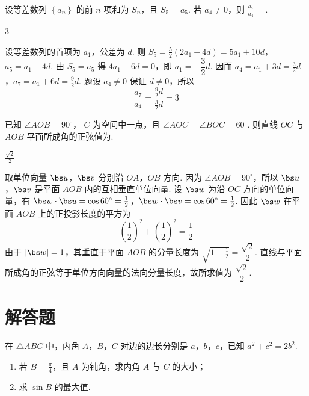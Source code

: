 \begin{problem}
设等差数列 \( \left\{a_{n}\right\} \) 的前 \(n\) 项和为 \( S_{n} \)，且 \( S_{5}=a_{5} \). 若 \( a_{4}\neq0 \)，则 \( \frac{a_{7}}{a_{4}}= \)\fillinblank{}.
\end{problem}

\begin{answer}
\(3\)
\end{answer}

\begin{solution}
设等差数列的首项为 \(a_1\)，公差为 \(d\). 则 \(S_5=\frac52(2a_1+4d)=5a_1+10d\)，\(a_5=a_1+4d\).
由 \(S_5=a_5\) 得 \(4a_1+6d=0\)，即 \(a_1=-\dfrac32d\). 因而
\(a_4=a_1+3d=\frac32d\)，\(a_7=a_1+6d=\frac92d\).
题设 \(a_4\ne0\) 保证 \(d\ne0\)，所以
\[
\frac{a_7}{a_4}=\frac{\frac92d}{\frac32d}=3
\]
\end{solution}

\begin{problem}
已知 \( \angle AOB = 90^\circ \)， \(C\) 为空间中一点，且 \( \angle AOC = \angle BOC = 60^\circ \). 则直线 \(OC\) 与 \(AOB\) 平面所成角的正弦值为\fillinblank{}.
\end{problem}

\begin{answer}
\( \frac{\sqrt{2}}{2} \)
\end{answer}

\begin{solution}
取单位向量 \(\bs u\)，\(\bs v\) 分别沿 \(OA\)，\(OB\) 方向. 因为 \(\angle AOB=90^\circ\)，所以 \(\bs u\)，\(\bs v\) 是平面 \(AOB\) 内的互相垂直单位向量. 设 \(\bs w\) 为沿 \(OC\) 方向的单位向量，有 \(\bs w\cdot\bs u=\cos60^\circ=\frac12\)，\(\bs w\cdot\bs v=\cos60^\circ=\frac12\).
因此 \(\bs w\) 在平面 \(AOB\) 上的正投影长度的平方为
\[
\left(\frac12\right)^2+\left(\frac12\right)^2=\frac12
\]
由于 \(|\bs w|=1\)，其垂直于平面 \(AOB\) 的分量长度为 \(\sqrt{1-\frac12}=\dfrac{\sqrt2}{2}\). 直线与平面所成角的正弦等于单位方向向量的法向分量长度，故所求值为 \(\dfrac{\sqrt2}{2}\).
\end{solution}

\section{解答题}

\begin{problem}
在 \(\triangle ABC\) 中，内角 \(A\)，\(B\)，\(C\) 对边的边长分别是 \(a\)，\(b\)，\(c\)，已知 \(a^2 + c^2 = 2b^2\).

\begin{enumerate}
\item 若 \(B=\frac{\pi}{4}\)，且 \(A\) 为钝角，求内角 \(A\) 与 \(C\) 的大小；

\item 求 \(\sin B\) 的最大值.
\end{enumerate}
\end{problem}

